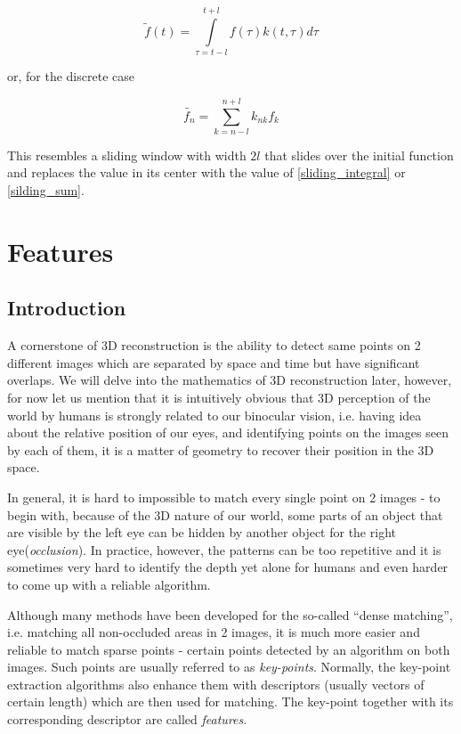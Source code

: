 \documentclass[11pt]{book}
\begin{document}
\begin{equation}
\tilde{f}(t) = \int\limits_{\tau = t -l}^{t+l}f(\tau) k(t,\tau) d\tau\label{sliding_integral}
\end{equation}

or, for the discrete case

\begin{equation}
\tilde{f_n} = \sum\limits_{k= n-l}^{n+l} k_{nk}f_k\label{silding_sum}
\end{equation}

This resembles a sliding window with width $2l$ that slides over the initial function and replaces the value in its center with the value  of \eqref{sliding_integral} or \eqref{silding_sum}.



\chapter{Features}

\section{Introduction}

A cornerstone of 3D reconstruction is the ability to detect same points on 2 different images which are separated by space and time but have significant overlaps. We will delve into the mathematics of 3D reconstruction later, however, for now let us mention that it is intuitively obvious that 3D perception of the world by humans is strongly related to our binocular vision, i.e. having idea about the relative position of our eyes, and identifying points on the images seen by each of them, it is a matter of geometry to recover their position in the 3D space.  

In general, it is hard to impossible to match every single point on 2 images - to begin with, because of the 3D nature of our world, some parts of an object that are visible by the left eye can be hidden by another object for the right eye({\it occlusion}). In practice, however, the patterns can be too repetitive and it is sometimes very hard to identify the depth yet alone for humans and even harder to come up with a reliable algorithm.


Although many methods have been developed for the so-called ``dense matching'', i.e. matching all non-occluded areas in 2 images, it is much more easier and reliable to match sparse points - certain points detected by an algorithm on both images. Such points are usually referred to as {\it key-points}. Normally, the key-point extraction algorithms also enhance them with descriptors (usually vectors of certain length) which are then used for matching. The key-point together with its corresponding descriptor are called {\it features}. 
\end{document}

